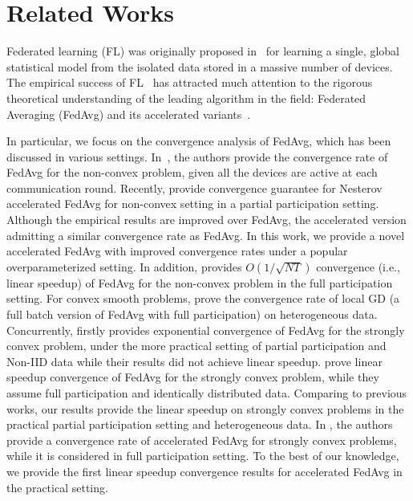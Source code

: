 
\section{Related Works}

Federated learning (FL) was originally proposed
in~\cite{mcmahan2016communication} for learning a single, global statistical
model from the isolated data stored in a massive number of devices.  The
empirical success of FL~\cite{chen2018federated,47586} has attracted much attention to the rigorous theoretical understanding of the leading algorithm in the field: Federated Averaging (FedAvg) and its accelerated variants~\cite{liu2019accelerating,haddadpour2019convergence,khaled2019first,li2019convergence,huo2020faster,yu2019linear,yu2019parallel}.

In particular, we focus on the convergence analysis of FedAvg, which
has been discussed in various settings. 
In~\cite{yu2019parallel,wang2019adaptive}, the authors provide the convergence rate of FedAvg for the non-convex problem, given all the devices are active at each communication round. Recently, \citep{huo2020faster} provide 
convergence guarantee for Nesterov accelerated FedAvg for non-convex 
setting in a partial participation setting. Although the empirical
results are improved over FedAvg, the accelerated version admitting a similar convergence rate as FedAvg. In this work, we provide a novel accelerated
FedAvg with improved convergence rates under a popular overparameterized setting. In addition, \cite{yu2019linear} provides $O(1/\sqrt{NT})$ 
convergence (i.e., linear speedup) of FedAvg for the non-convex problem in the full participation setting. 
For convex smooth problems, \cite{khaled2019first} prove the 
convergence rate of local GD (a full batch version of FedAvg with full participation) on heterogeneous data. 
Concurrently, \cite{li2019convergence} firstly provides exponential convergence of FedAvg for the strongly convex problem,
under the more practical setting of partial participation and Non-IID data while their results did not achieve linear speedup. 
\cite{stich2018local} prove linear speedup convergence of FedAvg for the strongly convex problem, while they assume full participation and identically distributed data. Comparing to previous works, our results provide the linear speedup on strongly convex problems in the practical partial participation setting and heterogeneous data. In \cite{liu2019accelerating}, the authors provide a convergence rate of accelerated FedAvg for strongly convex problems, while it is considered in full participation setting. To the best of our knowledge,
we provide the first linear speedup convergence results for accelerated FedAvg in the practical setting.










